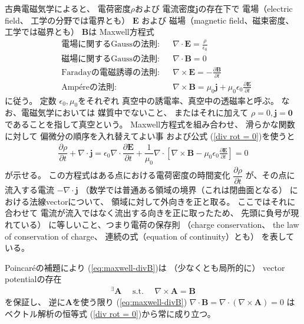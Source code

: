 古典電磁気学によると、
電荷密度$\rho$および
電流密度$\bm{j}$の存在下で
電場（electric field、
工学の分野では電界とも）
$\bm{E}$
および
磁場（magnetic field、磁束密度、
工学では磁界とも）
$\bm{B}$は
Maxwell方程式
\begin{subequations}
\begin{align}
&\text{電場に関するGaussの法則}:
  &&\nabla \cdot \bm{E}
=
  \frac{\rho}{\epsilon_0}
\label{eq:maxwell-divE}
\\
&\text{磁場に関するGaussの法則}:
  &&\nabla \cdot \bm{B}
= 0
\label{eq:maxwell-divB}
\\
&\text{Faradayの電磁誘導の法則}:
  &&\nabla \times \bm{E}
=
  - \frac{\partial \bm{B}}
    {\partial t}
\label{eq:maxwell-rot E}
\\
&\text{Amp\'ereの法則}:
  &&\nabla \times \bm{B}
=
  \mu_0 \bm{j}
  +
  \mu_0 \epsilon_0
    \frac{\partial \bm{E}}
      {\partial t}
\label{eq:maxwell-rot B}
\end{align}
\end{subequations}
に従う。
定数
$\epsilon_0, \mu_0$をそれぞれ
真空中の誘電率、真空中の透磁率と呼ぶ。
なお、電磁気学においては
媒質中でないこと、
またはそれに加えて
$\rho = 0, \bm{j} = \bm{0}$
であることを指して真空という。
Maxwell方程式を組み合わせ、
滑らかな関数に対して
偏微分の順序を入れ替えてよい事
および公式
(\ref{div rot = 0})を使うと
\begin{align}
  \dfrac{\partial \rho}{\partial t}
+
  \nabla \cdot \bm{j}
=
  \epsilon_0
  \nabla \cdot
  \dfrac{\partial \bm{E}}{\partial t}
+
  \dfrac{1}{\mu_0}
  \nabla \cdot
  \left[
    \nabla \times \bm{B}
  -
    \mu_0 \epsilon_0
    \frac{\partial \bm{E}}
      {\partial t}
  \right]
= 0
\label{electric charge conservation}
\end{align}
が示せる。
この方程式はある点における電荷密度の時間変化
$\dfrac{\partial \rho}{\partial t}$
が、その点に流入する電流
$- \nabla \cdot \bm{j}$
（数学では普通ある領域の境界（これは閉曲面となる）
における法線vectorについて、
領域に対して外向きを正と取る。
ここではそれに合わせて
電流が流入ではなく流出する向きを正に取ったため、
先頭に負号が現れている）
に等しいこと、つまり電荷の保存則
（charge conservation、
the law of conservation of charge、
連続の式（equation of continuity）とも）
を表している。

Poincar\'eの補題により
(\ref{eq:maxwell-divB})は
（少なくとも局所的に）
vector potentialの存在
\begin{align}
  {}^\exists
  \bm{A}
\quad
\text{ s.t. }
\quad
  \nabla \times \bm{A}
=
  \bm{B}
\end{align}
を保証し、
逆に$\bm{A}$を使う限り
(\ref{eq:maxwell-divB})
$\nabla \cdot \bm{B}
= \nabla \cdot
(\nabla \times \bm{A})
= 0$
はベクトル解析の恒等式
(\ref{div rot = 0})から常に成り立つ。

